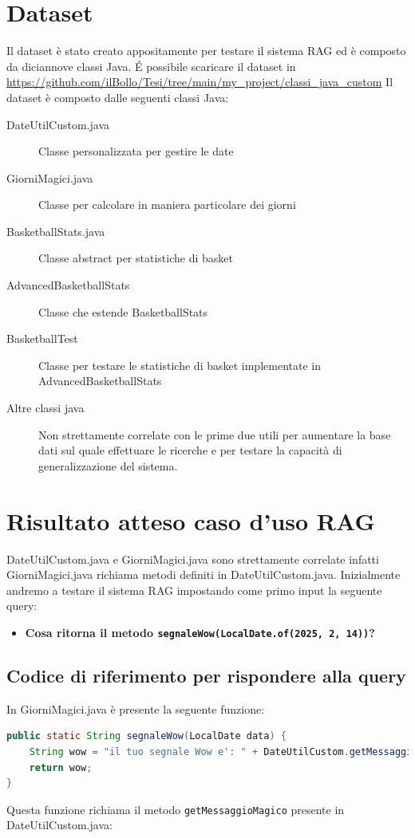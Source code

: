 \documentclass[12pt,a4paper,openright,twoside]{book}
\begin{document}
\section{Dataset}
Il dataset è stato creato appositamente per testare il sistema RAG ed è composto da diciannove classi Java.
\'E possibile scaricare il dataset in \url{https://github.com/ilBollo/Tesi/tree/main/my_project/classi_java_custom}
Il dataset è composto dalle seguenti classi Java: 
\begin{description}
    \item[DateUtilCustom.java] Classe personalizzata per gestire le date
    \item[GiorniMagici.java] Classe per calcolare in maniera particolare dei giorni
    \item[BasketballStats.java] Classe abstract per statistiche di basket
    \item[AdvancedBasketballStats] Classe che estende BasketballStats
    \item[BasketballTest] Classe per testare le statistiche di basket implementate in AdvancedBasketballStats
    \item[Altre classi java] Non strettamente correlate con le prime due utili per aumentare la base dati sul quale effettuare le ricerche e per testare la capacità di generalizzazione del sistema.
\end{description}
\section{Risultato atteso caso d'uso RAG}
DateUtilCustom.java e GiorniMagici.java sono strettamente correlate infatti GiorniMagici.java richiama metodi definiti in DateUtilCustom.java.
Inizialmente andremo a testare il sistema RAG impostando come primo input la seguente query: 
\begin{itemize}
    \item \textbf{Cosa ritorna il metodo \texttt{segnaleWow(LocalDate.of(2025, 2, 14))}?}
\end{itemize}

\subsection{Codice di riferimento per rispondere alla query}
In GiorniMagici.java è presente la seguente funzione:
\begin{lstlisting}[language=Java, caption={Metodo segnaleWow in GiorniMagici.java}, label={lst:segnaleWow}]
public static String segnaleWow(LocalDate data) {
    String wow = "il tuo segnale Wow e': " + DateUtilCustom.getMessaggioMagico(data);
    return wow;
}
\end{lstlisting}
Questa funzione richiama il metodo \texttt{getMessaggioMagico} presente in DateUtilCustom.java:
\end{document}
